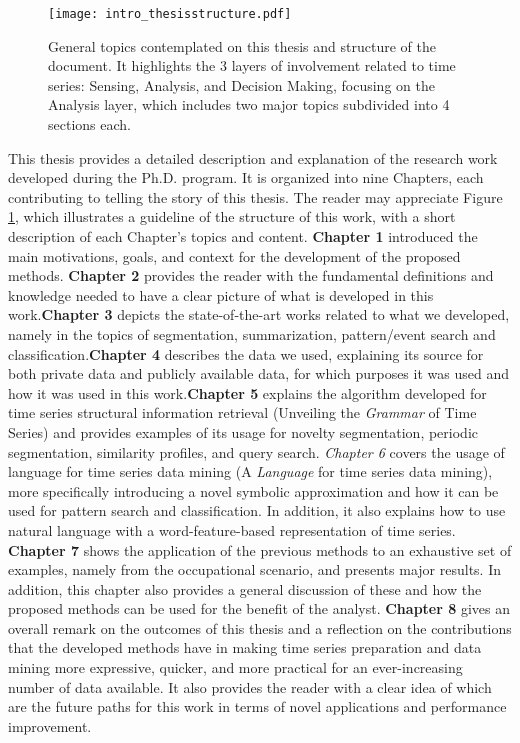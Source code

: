 \begin{figure}
\centering
\texttt{[image: intro\_thesisstructure.pdf]}
\caption{General topics contemplated on this thesis and structure of the document. It highlights the 3 layers of involvement related to time series: Sensing, Analysis, and Decision Making, focusing on the Analysis layer, which includes two major topics subdivided into 4 sections each.}
\label{fig:intro}
\end{figure}

This thesis provides a detailed description and explanation of the research work developed during the Ph.D. program. It is organized into nine Chapters, each contributing to telling the story of this thesis. The reader may appreciate Figure \ref{fig:intro}, which illustrates a guideline of the structure of this work, with a short description of each Chapter's topics and content. \textbf{Chapter 1} introduced the main motivations, goals, and context for the development of the proposed methods. \textbf{Chapter 2} provides the reader with the fundamental definitions and knowledge needed to have a clear picture of what is developed in this work.\textbf{Chapter 3} depicts the state-of-the-art works related to what we developed, namely in the topics of segmentation, summarization, pattern/event search and classification.\textbf{Chapter 4} describes the data we used, explaining its source for both private data and publicly available data, for which purposes it was used and how it was used in this work.\textbf{Chapter 5} explains the algorithm developed for time series structural information retrieval (Unveiling the \textit{Grammar} of Time Series) and provides examples of its usage for novelty segmentation, periodic segmentation, similarity profiles, and query search. \textit{Chapter 6} covers the usage of language for time series data mining (A \textit{Language} for time series data mining), more specifically introducing a novel symbolic approximation and how it can be used for pattern search and classification. In addition, it also explains how to use natural language with a word-feature-based representation of time series. \textbf{Chapter 7} shows the application of the previous methods to an exhaustive set of examples, namely from the occupational scenario, and presents major results. In addition, this chapter also provides a general discussion of these and how the proposed methods can be used for the benefit of the analyst. \textbf{Chapter 8} gives an overall remark on the outcomes of this thesis and a reflection on the contributions that the developed methods have in making time series preparation and data mining more expressive, quicker, and more practical for an ever-increasing number of data available. It also provides the reader with a clear idea of which are the future paths for this work in terms of novel applications and performance improvement.

